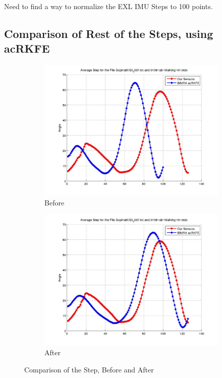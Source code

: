 \documentclass[12pt]{article}
\begin{document}
\FloatBarrier
Need to find a way to normalize the EXL IMU Steps to 100 points.

\FloatBarrier
\subsection*{Comparison of Rest of the Steps, using acRKFE}
\begin{figure}[h]%

\begin{subfigure}[!htb]{2cm}
\hspace*{-2cm} \includegraphics[scale=.22]{S0_0007_before.jpg}
\caption{Before}
\end{subfigure}
\hfill\hfill
\begin{subfigure}[h]{0.4\textwidth}
\hspace*{-2cm} \includegraphics[scale=.22]{S0_0007_after.jpg}
\caption{After}
\end{subfigure}%

\caption[Hello]{Comparison of the Step, Before and After}
\end{figure}
\end{document}
